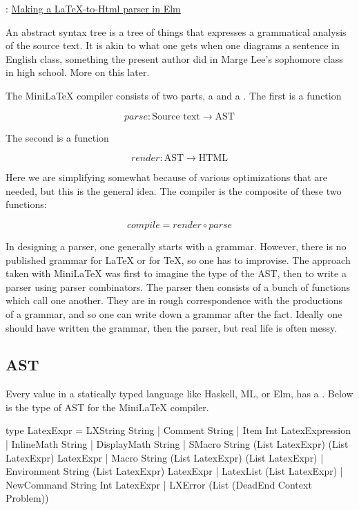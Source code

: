 : \href{https://www.youtube.com/watch?v=dmDA7iziSgs&t=15s}{Making a LaTeX-to-Html parser in Elm}

An abstract syntax tree is a tree of things that expresses a grammatical analysis of the source text. It is akin to what one gets when one diagrams a sentence in English class, something the present author did in Marge Lee's sophomore class in high school.  More on this later.


The MiniLaTeX compiler consists of two parts, a  and a .  The first is a function

$$
parse: \text{Source text} \to \text{AST}
$$

The second is a function

$$
render: \text{AST} \to \text{HTML}
$$

Here we are simplifying somewhat because of various optimizations that are needed, but this is the general idea.  The compiler is the composite of these two functions:

$$
compile   = render \circ parse
$$

In designing a parser, one generally starts with a grammar.  However, there is no published grammar for LaTeX or for TeX, so one has to improvise.  The approach taken with MiniLaTeX was first to imagine the type of the AST, then to write a parser using parser combinators.  The parser then consists of a bunch of functions which call one another.  They are in rough correspondence with the productions of a grammar, and so one can write down a grammar after the fact. Ideally one should have written the grammar, then the parser, but real life is often messy.

\subsection{AST}

Every value in a statically typed language like Haskell, ML, or Elm, has a .  Below is the type of AST for the MiniLaTeX compiler.

\begin{listing}
type LatexExpr
    = LXString String
    | Comment String
    | Item Int LatexExpression
    | InlineMath String
    | DisplayMath String
    | SMacro String (List LatexExpr) (List LatexExpr) LatexExpr
    | Macro String (List LatexExpr) (List LatexExpr)
    | Environment String (List LatexExpr) LatexExpr
    | LatexList (List LatexExpr)
    | NewCommand String Int LatexExpr
    | LXError (List (DeadEnd Context Problem))
\end{listing}


